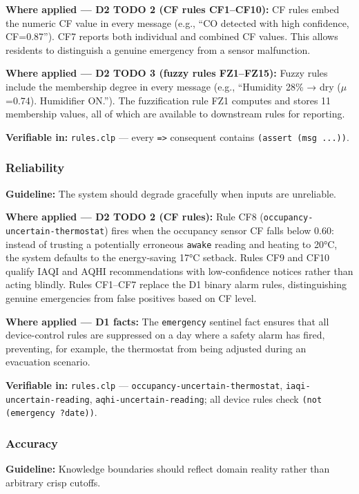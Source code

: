 \documentclass{article}
\begin{document}
\textbf{Where applied — D2 TODO 2 (CF rules CF1–CF10):} CF rules embed the numeric CF value in every message (e.g., ``CO detected with high confidence, CF=0.87''). CF7 reports both individual and combined CF values. This allows residents to distinguish a genuine emergency from a sensor malfunction.

\textbf{Where applied — D2 TODO 3 (fuzzy rules FZ1–FZ15):} Fuzzy rules include the membership degree in every message (e.g., ``Humidity 28\% → dry ($\mu$=0.74). Humidifier ON.''). The fuzzification rule FZ1 computes and stores 11 membership values, all of which are available to downstream rules for reporting.

\textbf{Verifiable in:} \texttt{rules.clp} — every \texttt{=>} consequent contains \texttt{(assert (msg ...))}.

\subsubsection{Reliability}

\textbf{Guideline:} The system should degrade gracefully when inputs are unreliable.

\textbf{Where applied — D2 TODO 2 (CF rules):} Rule CF8 (\texttt{occupancy-uncertain-thermostat}) fires when the occupancy sensor CF falls below 0.60: instead of trusting a potentially erroneous \texttt{awake} reading and heating to 20°C, the system defaults to the energy-saving 17°C setback. Rules CF9 and CF10 qualify IAQI and AQHI recommendations with low-confidence notices rather than acting blindly. Rules CF1–CF7 replace the D1 binary alarm rules, distinguishing genuine emergencies from false positives based on CF level.

\textbf{Where applied — D1 facts:} The \texttt{emergency} sentinel fact ensures that all device-control rules are suppressed on a day where a safety alarm has fired, preventing, for example, the thermostat from being adjusted during an evacuation scenario.

\textbf{Verifiable in:} \texttt{rules.clp} — \texttt{occupancy-uncertain-thermostat}, \texttt{iaqi-uncertain-reading}, \texttt{aqhi-uncertain-reading}; all device rules check \texttt{(not (emergency ?date))}.

\subsubsection{Accuracy}

\textbf{Guideline:} Knowledge boundaries should reflect domain reality rather than arbitrary crisp cutoffs.
\end{document}
